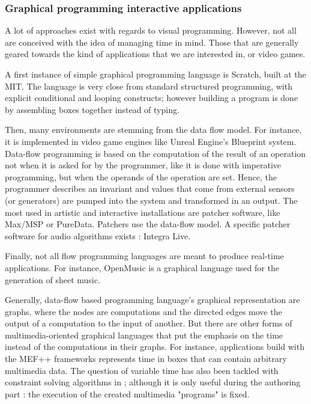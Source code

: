 \documentclass{sigchi}
\begin{document}
\subsubsection{Graphical programming interactive applications}
A lot of approaches exist with regards to visual programming. However, not all are conceived with the idea of managing time in mind. Those that are generally geared towards the kind of applications that we are interested in, or video games.

A first instance of simple graphical programming language is Scratch\cite{resnick2009scratch}, built at the MIT. The language is very close from standard structured programming, with explicit conditional and looping constructs; however building a program is done by assembling boxes together instead of typing.

Then, many environments are stemming from the data flow model. For instance, it is implemented in video game engines like Unreal Engine's Blueprint system\cite{shah2014mastering}. Data-flow programming is based on the computation of the result of an operation not when it is asked for by the programmer, like it is done with imperative programming, but when the operands of the operation are set. Hence, the programmer describes an invariant and values that come from external sensors (or generators) are pumped into the system and transformed in an output.
The most used in artistic and interactive installations are patcher software, like Max/MSP or PureData. Patchers use the data-flow model. A specific patcher software for audio algorithms exists : Integra Live\cite{bullock2011integra}.

Finally, not all flow programming languages are meant to produce real-time applications. For instance, OpenMusic\cite{bresson_openmusic:_2011} is a graphical language used for the generation of sheet music.

Generally, data-flow based programming language's graphical representation are graphs, where the nodes are computations and the directed edges move the output of a computation to the input of another.
But there are other forms of multimedia-oriented graphical languages that put the emphasis on the time instead of the computations in their graphs. For instance, applications build with the MEF++ frameworks\cite{ackermann_direct_1994} represents time in boxes that can contain arbitrary multimedia data. The question of variable time has also been tackled with constraint solving algorithms in \cite{song_interactive_1999}; although it is only useful during the authoring part : the execution of the created multimedia "programs" is fixed.
\end{document}
